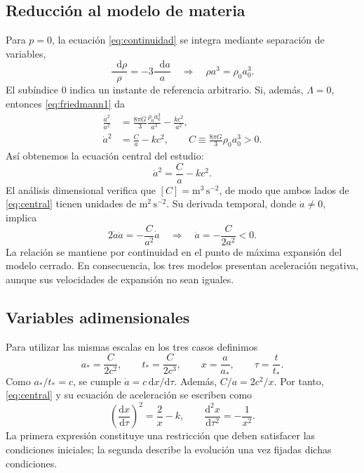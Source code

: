 \documentclass[letterpaper,11pt]{article}
\newcommand{\td}{\mathrm{d}}
\newcommand{\dd}{\mathop{}\!\mathrm{d}}
\begin{document}
\subsection{Reducción al modelo de materia}

Para $p=0$, la ecuación \eqref{eq:continuidad} se integra mediante separación de variables,
\[
\frac{\dd\rho}{\rho}=-3\frac{\dd a}{a}
\quad\Longrightarrow\quad
\rho a^3=\rho_0a_0^3.
\]
El subíndice $0$ indica un instante de referencia arbitrario. Si, además, $\Lambda=0$, entonces \eqref{eq:friedmann1} da
\begin{align*}
\frac{\dot a^2}{a^2}
&=\frac{8\pi G}{3}\frac{\rho_0a_0^3}{a^3}-\frac{kc^2}{a^2},\\
\dot a^2&=\frac{C}{a}-kc^2,
\qquad C\equiv\frac{8\pi G}{3}\rho_0a_0^3>0.
\end{align*}
Así obtenemos la ecuación central del estudio:
\begin{equation}
\boxed{\dot a^2=\frac{C}{a}-kc^2.}
\label{eq:central}
\end{equation}
El análisis dimensional verifica que $[C]=\mathrm{m^3\,s^{-2}}$, de modo que ambos lados de \eqref{eq:central} tienen unidades de $\mathrm{m^2\,s^{-2}}$. Su derivada temporal, donde $\dot a\neq0$, implica
\[
2\dot a\ddot a=-\frac{C}{a^2}\dot a
\quad\Longrightarrow\quad
\boxed{\ddot a=-\frac{C}{2a^2}<0.}
\]
La relación se mantiene por continuidad en el punto de máxima expansión del modelo cerrado. En consecuencia, los tres modelos presentan aceleración negativa, aunque sus velocidades de expansión no sean iguales.

\subsection{Variables adimensionales}

Para utilizar las mismas escalas en los tres casos definimos
\begin{equation}
a_* =\frac{C}{2c^2},\qquad
 t_* =\frac{C}{2c^3},\qquad
 x=\frac{a}{a_*},\qquad \tau=\frac{t}{t_*}.
\label{eq:escalas}
\end{equation}
Como $a_*/t_*=c$, se cumple $\dot a=c\,\td x/\td\tau$. Además, $C/a=2c^2/x$. Por tanto, \eqref{eq:central} y su ecuación de aceleración se escriben como
\begin{equation}
\boxed{\left(\frac{\td x}{\td\tau}\right)^2=\frac{2}{x}-k,\qquad
\frac{\td^2x}{\td\tau^2}=-\frac{1}{x^2}.}
\label{eq:adimensionales}
\end{equation}
La primera expresión constituye una restricción que deben satisfacer las condiciones iniciales; la segunda describe la evolución una vez fijadas dichas condiciones.
\end{document}
